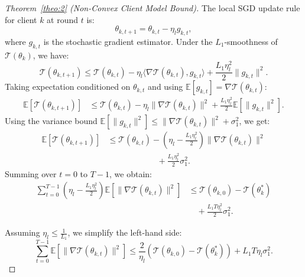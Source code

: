 \documentclass[lettersize,journal]{IEEEtran}
\newtheorem{proof}{Proof}
\begin{document}
\begin{proof}[Theorem~\ref{theo:2} (Non-Convex Client Model Bound)]
\label{proof:theo2-1}
The local SGD update rule for client \( k \) at round \( t \) is:
\begin{equation}
    \theta_{k,t+1} = \theta_{k,t} - \eta_l g_{k,t},
\end{equation}
where \( g_{k,t} \) is the stochastic gradient estimator. Under the \( L_1 \)-smoothness of \( \mathcal{T}(\theta_k) \), we have:
\begin{equation}
    \mathcal{T}(\theta_{k,t+1}) \leq \mathcal{T}(\theta_{k,t}) - \eta_l \langle \nabla \mathcal{T}(\theta_{k,t}), g_{k,t} \rangle + \frac{L_1 \eta_l^2}{2} \|g_{k,t}\|^2.
\end{equation}
Taking expectation conditioned on \( \theta_{k,t} \) and using \( \mathbb{E}[g_{k,t}] = \nabla \mathcal{T}(\theta_{k,t}) \):
\begin{equation}
\begin{split}
    \mathbb{E}[\mathcal{T}(\theta_{k,t+1})]
    &\leq \mathcal{T}(\theta_{k,t}) - \eta_l \|\nabla \mathcal{T}(\theta_{k,t})\|^2 + \frac{L_1 \eta_l^2}{2} \mathbb{E}[\|g_{k,t}\|^2].
\end{split}
\end{equation}
Using the variance bound \( \mathbb{E}[\|g_{k,t}\|^2] \leq \|\nabla \mathcal{T}(\theta_{k,t})\|^2 + \sigma_1^2 \), we get:
\begin{equation}
\begin{split}
    \mathbb{E}[\mathcal{T}(\theta_{k,t+1})]
    &\leq \mathcal{T}(\theta_{k,t}) - \left(\eta_l - \frac{L_1 \eta_l^2}{2}\right) \|\nabla \mathcal{T}(\theta_{k,t})\|^2\\ 
    & \qquad \qquad \qquad+ \frac{L_1 \eta_l^2}{2} \sigma_1^2.
\end{split}
\end{equation}
Summing over \( t = 0 \) to \( T-1 \), we obtain:
\begin{equation}
\begin{split}
    \sum_{t=0}^{T-1} \left( \eta_l - \frac{L_1 \eta_l^2}{2} \right) \mathbb{E}[\|\nabla \mathcal{T}(\theta_{k,t})\|^2]
    &\leq \mathcal{T}(\theta_{k,0}) - \mathcal{T}(\theta_k^*) \\
    & \quad + \frac{L_1 T \eta_l^2}{2} \sigma_1^2.
\end{split}
\end{equation}

Assuming \( \eta_l \leq \frac{1}{L_1} \), we simplify the left-hand side:
\begin{equation}
    \sum_{t=0}^{T-1} \mathbb{E}[\|\nabla \mathcal{T}(\theta_{k,t})\|^2]
    \leq \frac{2}{\eta_l} \left( \mathcal{T}(\theta_{k,0}) - \mathcal{T}(\theta_k^*) \right) + L_1 T \eta_l \sigma_1^2.
\end{equation}

\end{proof}
\end{document}
